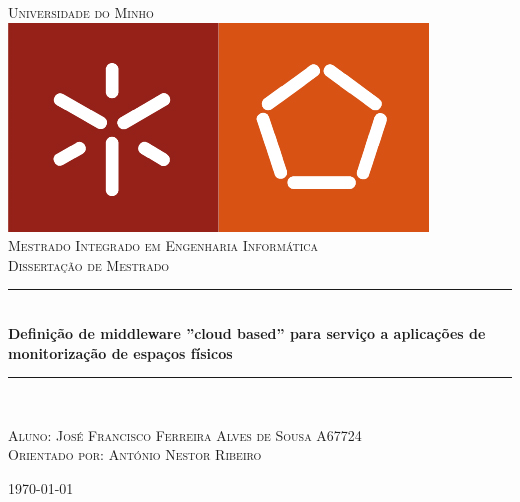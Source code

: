 \begin{titlepage}

\newcommand{\HRule}{\rule{\linewidth}{0.5mm}}

\center
 

\textsc{\LARGE Universidade do Minho}\\[1cm]
\includegraphics[scale=0.4]{img/logo.png}\\[1cm]
\textsc{\Large Mestrado Integrado em Engenharia Informática}\\[1cm]
\textsc{\Large Dissertação de Mestrado}\\[0.5cm]


{\huge \HRule \\[0.5cm]
\textbf{Definição de middleware ''cloud based'' para serviço a aplicações de monitorização de espaços físicos}
\HRule \\[3cm]}
 

\begin{flushleft}
\textsc{Aluno: José Francisco Ferreira Alves de Sousa A67724}\\[0.5cm]
\textsc{Orientado por: António Nestor Ribeiro}\\[3cm]
\end{flushleft}


\vfill
{\large \today}\\[3cm] %
 
\end{titlepage}
